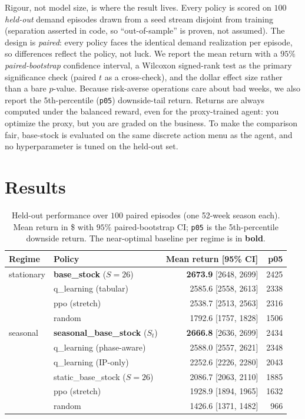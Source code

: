 \documentclass[11pt]{article}
\begin{document}
Rigour, not model size, is where the result lives. Every policy is scored on $100$ \emph{held-out}
demand episodes drawn from a seed stream disjoint from training (separation asserted in code, so
``out-of-sample'' is proven, not assumed). The design is \emph{paired}: every policy faces the
identical demand realization per episode, so differences reflect the policy, not luck. We report
the mean return with a $95\%$ \emph{paired-bootstrap} confidence interval, a Wilcoxon
signed-rank test as the primary significance check (paired $t$ as a cross-check), and the dollar
effect size rather than a bare $p$-value. Because risk-averse operations care about bad weeks, we
also report the $5$th-percentile (\texttt{p05}) downside-tail return. Returns are always computed
under the balanced reward, even for the proxy-trained agent: you optimize the proxy, but you are
graded on the business. To make the comparison fair, base-stock is evaluated on the same discrete
action menu as the agent, and no hyperparameter is tuned on the held-out set.

\section{Results}
\label{sec:results}

\begin{table}[t]
\centering
\caption{Held-out performance over $100$ paired episodes (one 52-week season each). Mean return
in \$ with $95\%$ paired-bootstrap CI; \texttt{p05} is the 5th-percentile downside return. The
near-optimal baseline per regime is in \textbf{bold}.}
\label{tab:results}
\begin{tabular}{llrr}
\toprule
Regime & Policy & Mean return [95\% CI] & p05 \\
\midrule
stationary  & \textbf{base\_stock} ($S{=}26$) & \textbf{2673.9} [2648, 2699] & 2425 \\
            & q\_learning (tabular)        & 2585.6 [2558, 2613] & 2338 \\
            & ppo (stretch)               & 2538.7 [2513, 2563] & 2316 \\
            & random                      & 1792.6 [1757, 1828] & 1506 \\
\midrule
seasonal    & \textbf{seasonal\_base\_stock} ($S_t$) & \textbf{2666.8} [2636, 2699] & 2434 \\
            & q\_learning (phase-aware)   & 2588.0 [2557, 2621] & 2348 \\
            & q\_learning (IP-only)       & 2252.6 [2226, 2280] & 2043 \\
            & static\_base\_stock ($S{=}26$) & 2086.7 [2063, 2110] & 1885 \\
            & ppo (stretch)               & 1928.9 [1894, 1965] & 1632 \\
            & random                      & 1426.6 [1371, 1482] & \phantom{0}966 \\
\bottomrule
\end{tabular}
\end{table}
\end{document}
